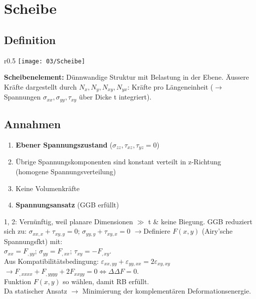 \section{Scheibe}
    \subsection{Definition}
        \begin{wrapfigure}[7]{r}{0.5\linewidth}
            \vspace{-3mm}
            \texttt{[image: 03/Scheibe]}
        \end{wrapfigure}
        \textbf{Scheibenelement:} Dünnwandige Struktur mit Belastung in der Ebene. Äussere Kräfte dargestellt durch $N_x,N_y,N_{xy},N_{yx}$: Kräfte pro Längeneinheit ($\rightarrow$ Spannungen $\sigma_{xx},\sigma_{yy},\tau_{xy}$ über Dicke t integriert).

    \subsection{Annahmen}
        \begin{enumerate}[noitemsep]
            \item \textbf{Ebener Spannungszustand} ($\sigma_{zz},\tau_{xz},\tau_{yz}=0$)
            \item Übrige Spannungskomponenten sind konstant verteilt in z-Richtung (homogene Spannungsverteilung)
            \item Keine Volumenkräfte
            \item \textbf{Spannungsansatz} (GGB erfüllt)
        \end{enumerate}
        1, 2: Vernünftig, weil planare Dimensionen $\gg$ t \& keine Biegung. GGB reduziert sich zu: $\displaystyle\sigma_{xx,x} + \tau_{xy,y}=0$; $\sigma_{yy,y} + \tau_{xy,x}=0$
        $\rightarrow$Definiere $F(x,y)$ (Airy'sche Spannungsfkt) mit:\\ $\sigma_{xx}=F_{,yy}$; $\sigma_{yy}=F_{,xx}$; $\tau_{xy}=-F_{,xy}$.
        \\Aus Kompatibilitätsbedingung: $\varepsilon_{xx,yy}+\varepsilon_{yy,xx}=2\varepsilon_{xy,xy}$ \\$\rightarrow F_{,xxxx}+F_{,yyyy}+2F_{xxyy}=0 \Leftrightarrow\Delta\Delta F=0$.
        \\Funktion $F(x,y)$ so wählen, damit RB erfüllt.
	\\Da statischer Ansatz $\rightarrow$ Minimierung der komplementären Deformationsenergie.
